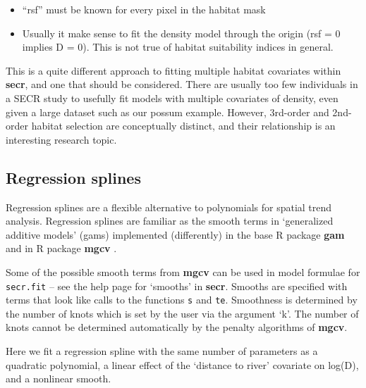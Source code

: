 \documentclass[
]{book}
\providecommand{\tightlist}{%
  \setlength{\itemsep}{0pt}\setlength{\parskip}{0pt}}
\begin{document}
\begin{itemize}
\tightlist
\item
  ``rsf'' must be known for every pixel in the habitat mask
\item
  Usually it make sense to fit the density model through the origin (rsf = 0 implies D = 0). This is not true of habitat suitability indices in general.
\end{itemize}

This is a quite different approach to fitting multiple habitat covariates within \textbf{secr}, and one that should be considered. There are usually too few individuals in a SECR study to usefully fit models with multiple covariates of density, even given a large dataset such as our possum example. However, 3rd-order and 2nd-order habitat selection are conceptually distinct, and their relationship is an interesting research topic.

\subsection{Regression splines}\label{regression-splines-1}


Regression splines are a flexible alternative to polynomials for spatial trend analysis. Regression splines are familiar as the smooth terms in `generalized additive models' (gams) implemented (differently) in the base R package \textbf{gam} and in R package \textbf{mgcv} \citep{w06}.

Some of the possible smooth terms from \textbf{mgcv} can be used in model formulae for \texttt{secr.fit} -- see the help page for `smooths' in \textbf{secr}. Smooths are specified with terms that look like calls to the functions \texttt{s} and \texttt{te}. Smoothness is determined by the number of knots which is set by the user via the argument `k'. The number of knots cannot be determined automatically by the penalty algorithms of \textbf{mgcv}.

Here we fit a regression spline with the same number of parameters as a quadratic polynomial, a linear effect of the `distance to river' covariate on log(D), and a nonlinear smooth.
\end{document}
